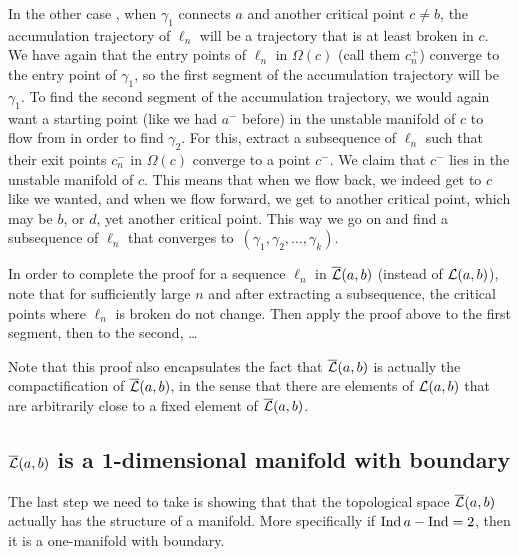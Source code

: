 \begin{myproof}
    In the other case , when $\gamma_1$ connects $a$ and another critical point $c \neq b$, the accumulation trajectory of $\ell_n$ will be a trajectory that is at least broken in $c$.
We have again that the entry points of $\ell_n$ in $\Omega(c)$ (call them $c_n^{+}$) converge to the entry point of $\gamma_1$, so the first segment of the accumulation trajectory will be $\gamma_1$.
To find the second segment of the accumulation trajectory, we would again want a starting point (like we had $a^{-}$ before) in the unstable manifold of $c$ to flow from in order to find $\gamma_{2}$.
For this, extract a subsequence of $\ell_n$ such that their exit points $c^{-}_n$ in $\Omega(c)$ converge to a point $c^{-}$.
We claim that $c^{-}$ lies in the unstable manifold of $c$.
This means that when we flow back, we indeed get to $c$ like we wanted, and when we flow forward, we get to another critical point, which may be $b$, or $d$, yet another critical point. This way we go on and find a subsequence of $\ell_n$ that converges to~$(\gamma_1, \gamma_2, \ldots, \gamma_k)$.

In order to complete the proof for a sequence $\ell_n$ in $ \overline{\mathcal L}(a, b)$ (instead of $\mathcal L(a, b)$), note that for sufficiently large $n$ and after extracting a subsequence, the critical points where $ \ell_n$ is broken do not change. Then apply the proof above to the first segment, then to the second, \ldots
\end{myproof}

Note that this proof also encapsulates the fact that $\overline{\mathcal L}(a, b)$ is actually the compactification of  $\overline{\mathcal L}(a, b)$, in the sense that there are elements of  $\mathcal L(a, b)$ that are arbitrarily close to a fixed element of $\overline{\mathcal L}(a, b)$.


\subsection{$\overline{\mathcal L}(a, b)$ is a 1-dimensional manifold with boundary}

The last step we need to take is showing that that the topological space $\overline{\mathcal L}(a, b)$ actually has the structure of a manifold.
More specifically if $\operatorname{Ind} a - \operatorname{Ind} = 2$, then it is a one-manifold with boundary.

